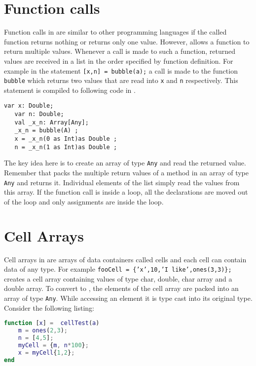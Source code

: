 \section{Function calls}

Function calls in \matlab are similar to other programming languages if
the called function returns nothing or returns only one value. However,
\matlab allows a function to return multiple values.
Whenever a call is made to such a function, returned values are received
in a list in the order specified by function definition. For example in
the statement \verb|[x,n] = bubble(a);| a call is made to the function
\verb|bubble| which returns two values that are read into \verb|x| and
\verb|n| respectively. This statement is compiled to following code in
\xten.

\begin{lstlisting}[language=X10,numbers=none]
   var x: Double;
   var n: Double;
   val _x_n: Array[Any];
   _x_n = bubble(A) ;
   x = _x_n(0 as Int)as Double ;
   n = _x_n(1 as Int)as Double ;
\end{lstlisting}

The key idea here is to create an array of type \verb|Any| and read the
returned value. Remember that \mixten packs the multiple return values
of a method in an array of type \verb|Any| and returns it.  Individual
elements of the list simply read the values from this array. If the
function call is inside a loop, all the declarations are moved out of
the loop and only assignments are inside the loop. 

\section{Cell Arrays}

Cell arrays in \matlab are arrays of data containers called cells and
each cell can contain data of any type. For example \texttt{fooCell =
\{'x',10,'I like',ones(3,3)\};} creates a cell array containing values
of type char, double, char array and a double array. To convert to
\xten, the elements of the cell array are packed into an \xten array of
type \verb|Any|. While accessing an element it is type cast into its
original type.  Consider the following \matlab listing:
  
\begin{lstlisting}[language=Matlab,numbers=none]
function [x] =  cellTest(a)
	m = ones(2,3);
	n = [4,5];
	myCell = {m, n*100};
	x = myCell{1,2};
end
\end{lstlisting}

